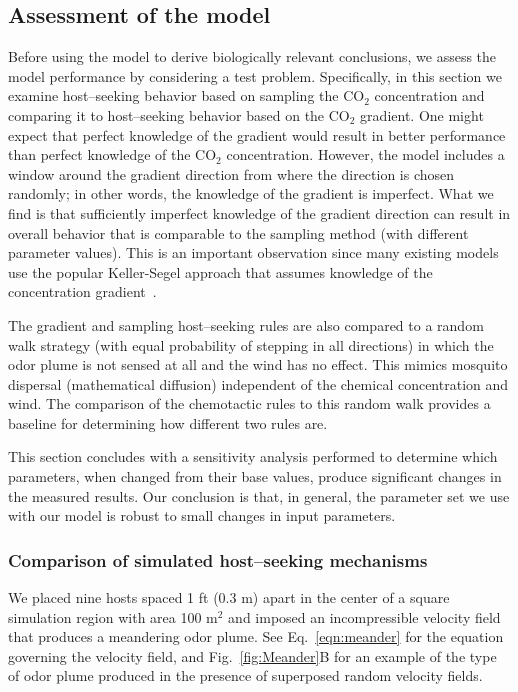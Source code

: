 \documentclass[10pt]{article}
\begin{document}
\subsection*{Assessment of the model}
Before using the model to derive biologically relevant conclusions, we assess the model performance
by considering a test problem.  Specifically, in this section we examine host--seeking 
behavior based on sampling the CO$_2$ concentration and comparing it to host--seeking behavior based on
the CO$_2$ gradient. One might expect that perfect knowledge of the gradient would result in 
better performance than perfect knowledge of the CO$_2$ concentration.  However, the model 
includes a window around the gradient direction from where the direction is chosen randomly; in other
words, the knowledge of the gradient is imperfect.  What we find is that sufficiently imperfect knowledge
of the gradient direction can result in overall behavior that is comparable to the sampling method (with
different parameter values).  This is an important observation since many existing models use the
popular Keller-Segel approach that assumes knowledge of the concentration 
gradient~\cite{KellerSegel,Hortsmann}.

The gradient and sampling host--seeking rules are also compared to a random walk strategy (with 
equal probability of stepping in all directions) in which the odor plume is not sensed at all and the wind has no effect.  This 
mimics mosquito dispersal (mathematical diffusion) independent of the chemical concentration and wind.  The comparison of the
chemotactic rules to this random walk provides a baseline for determining how different two rules are.

This section concludes with a sensitivity analysis performed to determine which parameters, when 
changed from their base values, produce significant changes in the measured results.  Our 
conclusion is that, in general, the parameter set we use with our model is robust to small changes 
in input parameters.

\subsubsection*{Comparison of simulated host--seeking mechanisms}

We placed nine hosts spaced 1 ft (0.3 m) apart in the center of a square simulation region with area 100 m${^2}$ and imposed an incompressible velocity field that produces a meandering odor plume. See Eq.~\eqref{eqn:meander} for the equation governing the velocity field, and Fig.~\ref{fig:Meander}B for an example of the type of odor plume produced in the presence of superposed random velocity fields. 
\end{document}
